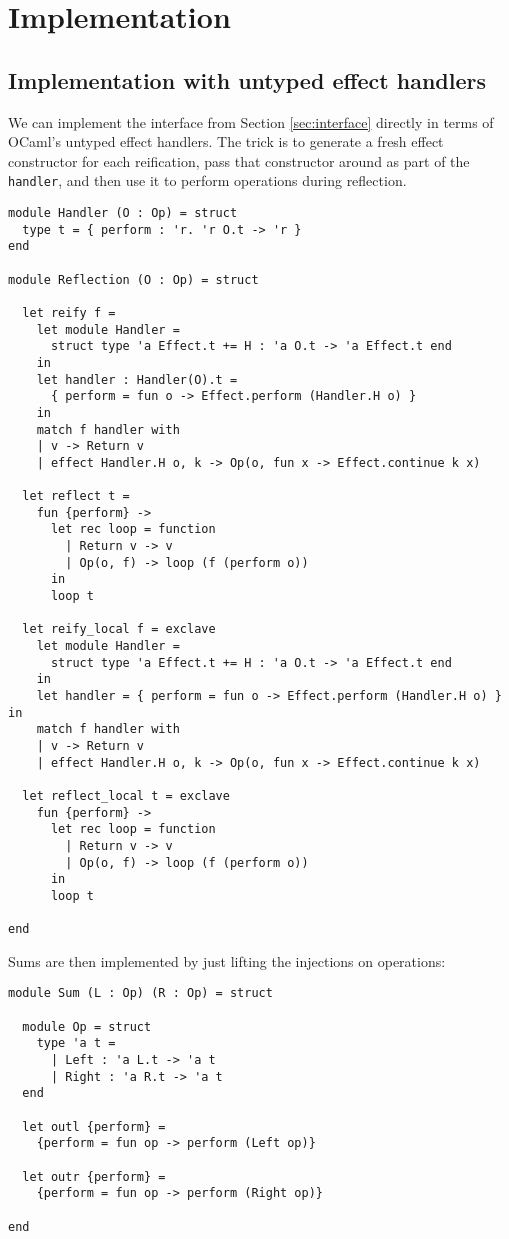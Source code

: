 \documentclass[acmsmall, screen, nonacm]{acmart}
\theoremstyle{definition}
\begin{document}
\section{Implementation}
\label{sec:implementation}

\subsection{Implementation with untyped effect handlers}

We can implement the interface from Section \ref{sec:interface} directly
in terms of OCaml's untyped effect
handlers\cite{Sivaramakrishnan2021retrofitting}. The trick is to
generate a fresh effect constructor for each reification, pass that
constructor around as part of the \lstinline[style=oxcaml]{handler}, and
then use it to perform operations during reflection.

\begin{lstlisting}[style=oxcaml]
module Handler (O : Op) = struct
  type t = { perform : 'r. 'r O.t -> 'r }
end

module Reflection (O : Op) = struct

  let reify f =
    let module Handler =
      struct type 'a Effect.t += H : 'a O.t -> 'a Effect.t end
    in
    let handler : Handler(O).t =
      { perform = fun o -> Effect.perform (Handler.H o) }
    in
    match f handler with
    | v -> Return v
    | effect Handler.H o, k -> Op(o, fun x -> Effect.continue k x)

  let reflect t =
    fun {perform} ->
      let rec loop = function
        | Return v -> v
        | Op(o, f) -> loop (f (perform o))
      in
      loop t

  let reify_local f = exclave
    let module Handler =
      struct type 'a Effect.t += H : 'a O.t -> 'a Effect.t end
    in
    let handler = { perform = fun o -> Effect.perform (Handler.H o) } in
    match f handler with
    | v -> Return v
    | effect Handler.H o, k -> Op(o, fun x -> Effect.continue k x)

  let reflect_local t = exclave
    fun {perform} ->
      let rec loop = function
        | Return v -> v
        | Op(o, f) -> loop (f (perform o))
      in
      loop t

end
\end{lstlisting}
Sums are then implemented by just lifting the injections on operations:
\begin{lstlisting}[style=oxcaml]
module Sum (L : Op) (R : Op) = struct

  module Op = struct
    type 'a t =
      | Left : 'a L.t -> 'a t
      | Right : 'a R.t -> 'a t
  end    

  let outl {perform} =
    {perform = fun op -> perform (Left op)}

  let outr {perform} =
    {perform = fun op -> perform (Right op)}

end
\end{lstlisting}
\end{document}
